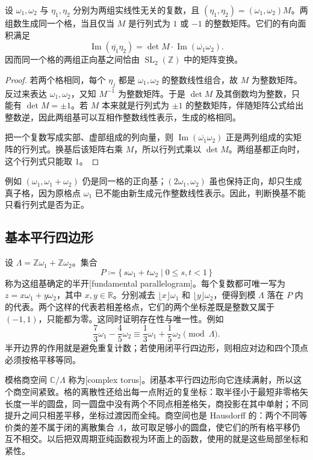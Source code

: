 \begin{proposition}\label{b3:prop:22-lattice-bases}
设 \(\omega_1,\omega_2\) 与 \(\eta_1,\eta_2\) 分别为两组实线性无关的复数，且 \((\eta_1,\eta_2)=(\omega_1,\omega_2)M\)。两组数生成同一个格，当且仅当 \(M\) 是行列式为 \(1\) 或 \(-1\) 的整数矩阵。它们的有向面积满足
\[
 \operatorname{Im}(\overline{\eta_1}\eta_2)
 =\det M\cdot\operatorname{Im}(\overline{\omega_1}\omega_2).
\]
因而同一个格的两组正向基之间恰由 \(\operatorname{SL}_2(\mathbb Z)\) 中的矩阵变换。
\end{proposition}
\begin{proof}
若两个格相同，每个 \(\eta_j\) 都是 \(\omega_1,\omega_2\) 的整数线性组合，故 \(M\) 为整数矩阵。反过来表达 \(\omega_1,\omega_2\)，又知 \(M^{-1}\) 为整数矩阵。于是 \(\det M\) 及其倒数均为整数，只能有 \(\det M=\pm1\)。若 \(M\) 本来就是行列式为 \(\pm1\) 的整数矩阵，伴随矩阵公式给出整数逆，因此两组基可以互相作整数线性表示，生成的格相同。

把一个复数写成实部、虚部组成的列向量，则 \(\operatorname{Im}(\overline{\omega_1}\omega_2)\) 正是两列组成的实矩阵的行列式。换基后该矩阵右乘 \(M\)，所以行列式乘以 \(\det M\)。两组基都正向时，这个行列式只能取 \(1\)。
\end{proof}

例如 \((\omega_1,\omega_1+\omega_2)\) 仍是同一格的正向基；\((2\omega_1,\omega_2)\) 虽也保持正向，却只生成真子格，因为原格点 \(\omega_1\) 已不能由新生成元作整数线性表示。因此，判断换基不能只看行列式是否为正。

\subsection{基本平行四边形}
\label{b3:subsec:220102}

设 \(\Lambda=\mathbb Z\omega_1+\mathbb Z\omega_2\)。集合
\[
 P\coloneqq\{\,s\omega_1+t\omega_2\mid 0\le s,t<1\,\}
\]
称为这组基确定的半开[fundamental parallelogram]。每个复数都可唯一写为 \(z=x\omega_1+y\omega_2\)，其中 \(x,y\in\mathbb R\)。分别减去 \(\lfloor x\rfloor\omega_1\) 和 \(\lfloor y\rfloor\omega_2\)，便得到模 \(\Lambda\) 落在 \(P\) 内的代表。两个这样的代表若相差格点，它们的两个坐标差既是整数又属于 \((-1,1)\)，只能都为零。这同时证明存在性与唯一性。例如
\[
 \frac73\omega_1-\frac45\omega_2
 \equiv\frac13\omega_1+\frac15\omega_2\pmod\Lambda.
\]
半开边界的作用就是避免重复计数；若使用闭平行四边形，则相应对边和四个顶点必须按格平移等同。

\ProseParagraphBreak
模格商空间 \(\mathbb C/\Lambda\) 称为[complex torus]。闭基本平行四边形向它连续满射，所以这个商空间紧致。格的离散性还给出每一点附近的复坐标：取半径小于最短非零格矢长度一半的圆盘，同一圆盘中没有两个不同点相差格矢，商投影在其中单射；不同提升之间只相差平移，坐标过渡因而全纯。商空间也是 Hausdorff 的：两个不同等价类的差不属于闭的离散集合 \(\Lambda\)，故可取足够小的圆盘，使它们的所有格平移仍互不相交。以后把双周期亚纯函数视为环面上的函数，使用的就是这些局部坐标和紧性。

